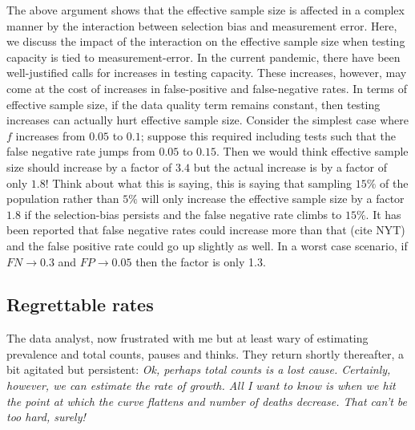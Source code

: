 \documentclass[11pt]{article}
\numberwithin{equation}{section}
\theoremstyle{plain}
\begin{document}
The above argument shows that the effective sample size is affected in a complex manner by the interaction between selection bias and measurement error.  Here, we discuss the impact of the interaction on the effective sample size when testing capacity is tied to measurement-error.  In the current pandemic, there have been well-justified calls for increases in testing capacity.  These increases, however, may come at the cost of increases in false-positive and false-negative rates.  In terms of effective sample size, if the data quality term remains constant, then testing increases can actually hurt effective sample size.  Consider the simplest case where $f$ increases from $0.05$ to $0.1$; suppose this required including tests such that the false negative rate jumps from $0.05$ to $0.15$.  Then we would think effective sample size should increase by a factor of $3.4$ but the actual increase is by a factor of only $1.8$!  Think about what this is saying, this is saying that sampling $15\%$ of the population rather than $5\%$ will only increase the effective sample size by a factor $1.8$ if the selection-bias persists and the false negative rate climbs to $15\%$.   It has been reported that false negative rates could increase more than that (cite NYT) and the false positive rate could go up slightly as well.  In a worst case scenario, if $FN \to 0.3$ and $FP \to 0.05$ then the factor is only 1.3.

\subsection{Regrettable rates}
\label{section:rates}

The data analyst, now frustrated with me but at least wary of estimating prevalence and total counts, pauses and thinks.  They return shortly thereafter, a bit agitated but persistent: \emph{Ok, perhaps total counts is a lost cause. Certainly, however, we can estimate the rate of growth.  All I want to know is when we hit the point at which the curve flattens and number of deaths decrease.  That can't be too hard, surely!}
\end{document}
